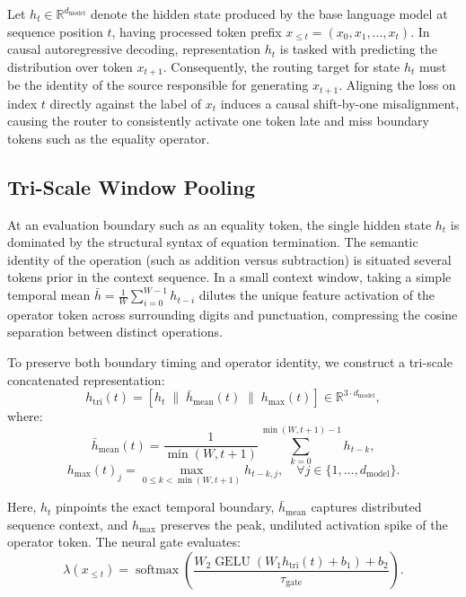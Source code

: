 \documentclass[preprint,12pt]{elsarticle}
\begin{document}
Let $h_t \in \mathbb{R}^{d_{\mathrm{model}}}$ denote the hidden state produced by the base language model at sequence position $t$, having processed token prefix $x_{\le t} = (x_0, x_1, \dots, x_t)$. In causal autoregressive decoding, representation $h_t$ is tasked with predicting the distribution over token $x_{t+1}$. Consequently, the routing target for state $h_t$ must be the identity of the source responsible for generating $x_{t+1}$. Aligning the loss on index $t$ directly against the label of $x_t$ induces a causal shift-by-one misalignment, causing the router to consistently activate one token late and miss boundary tokens such as the equality operator.

\subsection{Tri-Scale Window Pooling}

At an evaluation boundary such as an equality token, the single hidden state $h_t$ is dominated by the structural syntax of equation termination. The semantic identity of the operation (such as addition versus subtraction) is situated several tokens prior in the context sequence. In a small context window, taking a simple temporal mean $\bar{h} = \frac{1}{W} \sum_{i=0}^{W-1} h_{t-i}$ dilutes the unique feature activation of the operator token across surrounding digits and punctuation, compressing the cosine separation between distinct operations.

To preserve both boundary timing and operator identity, we construct a tri-scale concatenated representation:
\begin{equation}
h_{\mathrm{tri}}(t) = \left[ h_t \;\Big\|\; \bar{h}_{\mathrm{mean}}(t) \;\Big\|\; h_{\mathrm{max}}(t) \right] \in \mathbb{R}^{3 \cdot d_{\mathrm{model}}},
\end{equation}
where:
\begin{equation}
\bar{h}_{\mathrm{mean}}(t) = \frac{1}{\min(W, t+1)} \sum_{k=0}^{\min(W, t+1)-1} h_{t-k},
\end{equation}
\begin{equation}
h_{\mathrm{max}}(t)_j = \max_{0 \le k < \min(W, t+1)} h_{t-k, j}, \quad \forall j \in \{1, \dots, d_{\mathrm{model}}\}.
\end{equation}

Here, $h_t$ pinpoints the exact temporal boundary, $\bar{h}_{\mathrm{mean}}$ captures distributed sequence context, and $h_{\mathrm{max}}$ preserves the peak, undiluted activation spike of the operator token. The neural gate evaluates:
\begin{equation}
\lambda(x_{\le t}) = \operatorname{softmax}\left( \frac{W_2 \operatorname{GELU}(W_1 h_{\mathrm{tri}}(t) + b_1) + b_2}{\tau_{\mathrm{gate}}} \right).
\end{equation}
\end{document}
